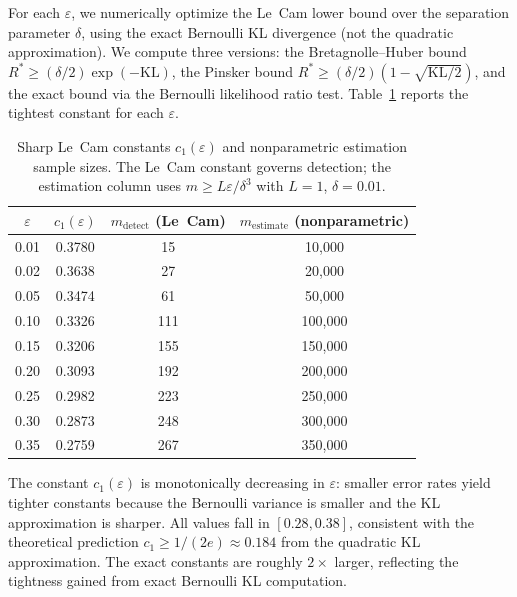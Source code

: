 \documentclass{article}
\newcommand{\Lip}{L}
\newcommand{\errrate}{\varepsilon}
\newcommand{\nsamples}{m}
\providecommand{\KL}{}
\renewcommand{\KL}{\mathrm{KL}}
\newcommand{\targetacc}{\delta}
\theoremstyle{definition}
\begin{document}
For each $\errrate$, we numerically optimize the Le~Cam lower bound over the separation parameter $\delta$, using the exact Bernoulli KL divergence (not the quadratic approximation). We compute three versions: the Bretagnolle--Huber bound $R^* \geq (\delta/2)\exp(-\KL)$, the Pinsker bound $R^* \geq (\delta/2)(1 - \sqrt{\KL/2})$, and the exact bound via the Bernoulli likelihood ratio test. Table~\ref{tab:sharp-constants} reports the tightest constant for each $\errrate$.

\begin{table}[h]
\centering
\caption{Sharp Le~Cam constants $c_1(\errrate)$ and nonparametric estimation sample sizes. The Le~Cam constant governs detection; the estimation column uses $\nsamples \geq \Lip\errrate/\targetacc^3$ with $\Lip = 1$, $\targetacc = 0.01$.}
\label{tab:sharp-constants}
\begin{tabular}{cccc}
\toprule
$\errrate$ & $c_1(\errrate)$ & $\nsamples_{\mathrm{detect}}$ (Le~Cam) & $\nsamples_{\mathrm{estimate}}$ (nonparametric) \\
\midrule
0.01 & 0.3780 & 15 & 10{,}000 \\
0.02 & 0.3638 & 27 & 20{,}000 \\
0.05 & 0.3474 & 61 & 50{,}000 \\
0.10 & 0.3326 & 111 & 100{,}000 \\
0.15 & 0.3206 & 155 & 150{,}000 \\
0.20 & 0.3093 & 192 & 200{,}000 \\
0.25 & 0.2982 & 223 & 250{,}000 \\
0.30 & 0.2873 & 248 & 300{,}000 \\
0.35 & 0.2759 & 267 & 350{,}000 \\
\bottomrule
\end{tabular}
\end{table}

The constant $c_1(\errrate)$ is monotonically decreasing in $\errrate$: smaller error rates yield tighter constants because the Bernoulli variance is smaller and the KL approximation is sharper. All values fall in $[0.28, 0.38]$, consistent with the theoretical prediction $c_1 \geq 1/(2e) \approx 0.184$ from the quadratic KL approximation. The exact constants are roughly $2\times$ larger, reflecting the tightness gained from exact Bernoulli KL computation.

\end{document}
